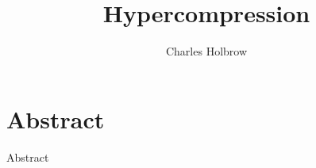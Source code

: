 \documentclass[openany]{tufte-book}
\title{Hypercompression}
\author{Charles Holbrow}
\begin{document}
\frontmatter


\chapter*{Abstract}
\label{ch:abstract}
 Abstract
\clearpage




\mainmatter
\tableofcontents






\backmatter
%



\end{document}

